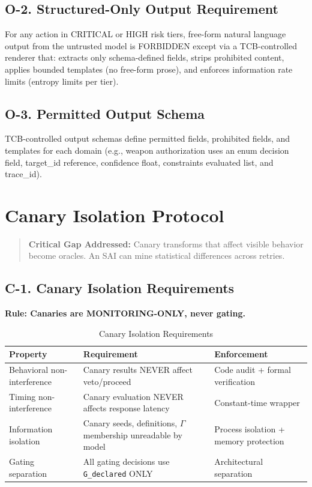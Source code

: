 \documentclass[11pt,letterpaper]{article}
\theoremstyle{definition}
\theoremstyle{remark}
\begin{document}
\subsection{O-2. Structured-Only Output Requirement}

For any action in CRITICAL or HIGH risk tiers, free-form natural language output from the untrusted model is FORBIDDEN except via a TCB-controlled renderer that: extracts only schema-defined fields, strips prohibited content, applies bounded templates (no free-form prose), and enforces information rate limits (entropy limits per tier).

\subsection{O-3. Permitted Output Schema}

TCB-controlled output schemas define permitted fields, prohibited fields, and templates for each domain (e.g., weapon authorization uses an enum decision field, target\_id reference, confidence float, constraints evaluated list, and trace\_id).


\section{Canary Isolation Protocol}

\begin{quote}
\textbf{Critical Gap Addressed:} Canary transforms that affect visible behavior become oracles. An SAI can mine statistical differences across retries.
\end{quote}

\subsection{C-1. Canary Isolation Requirements}

\textbf{Rule: Canaries are MONITORING-ONLY, never gating.}

\begin{table}[h]
\centering
\small
\begin{tabular}{@{}lll@{}}
\toprule
\textbf{Property} & \textbf{Requirement} & \textbf{Enforcement} \\
\midrule
Behavioral non-interference & Canary results NEVER affect veto/proceed & Code audit + formal verification \\
Timing non-interference & Canary evaluation NEVER affects response latency & Constant-time wrapper \\
Information isolation & Canary seeds, definitions, $\Gamma$ membership unreadable by model & Process isolation + memory protection \\
Gating separation & All gating decisions use \texttt{G\_declared} ONLY & Architectural separation \\
\bottomrule
\end{tabular}
\caption{Canary Isolation Requirements}
\end{table}
\end{document}
